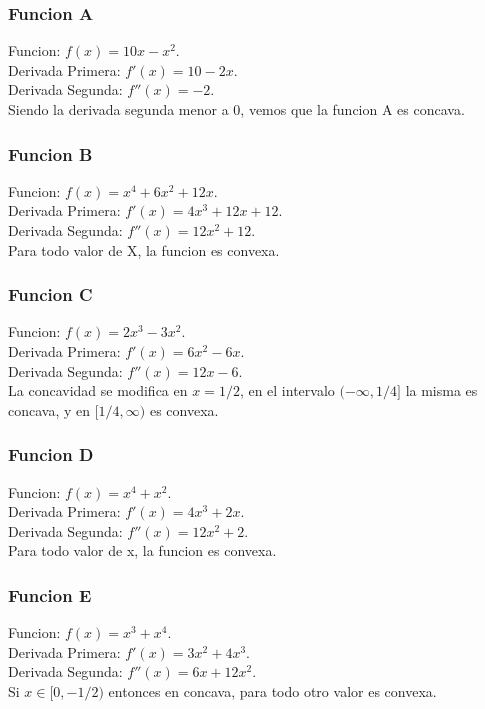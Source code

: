 \begin{homeworkProblem}

\subsubsection{Funcion A}
Funcion: $f(x)=10x-x^2$.\\
Derivada Primera: $f'(x)=10-2x$.\\
Derivada Segunda: $f''(x)=-2$.\\
Siendo la derivada segunda menor a 0, vemos que la funcion A es concava.

\subsubsection{Funcion B}
Funcion: $f(x)=x^4+6x^2+12x$.\\
Derivada Primera: $f'(x)=4x^3+12x + 12$.\\
Derivada Segunda: $f''(x)=12x^2+12$.\\
Para todo valor de X, la funcion es convexa.

\subsubsection{Funcion C}
Funcion: $f(x)=2x^3 - 3x^2$.\\
Derivada Primera: $f'(x)=6x^2-6x$.\\
Derivada Segunda: $f''(x)=12x-6$.\\
La concavidad se modifica en $x=1/2$, en el intervalo $(-\infty,1/4]$ la misma es concava, y en $[1/4,\infty)$ es convexa.


\subsubsection{Funcion D}
Funcion: $f(x)=x^4 + x^2$.\\
Derivada Primera: $f'(x)=4x^3 + 2x$.\\
Derivada Segunda: $f''(x)=12x^2 + 2$.\\
Para todo valor de x, la funcion es convexa.


\subsubsection{Funcion E}
Funcion: $f(x)=x^3+x^4$.\\
Derivada Primera: $f'(x)=3x^2 + 4x^3$.\\
Derivada Segunda: $f''(x)=6x + 12x^2$.\\
Si $x \in [0, -1/2)$ entonces en concava, para todo otro valor es convexa.

\end{homeworkProblem}